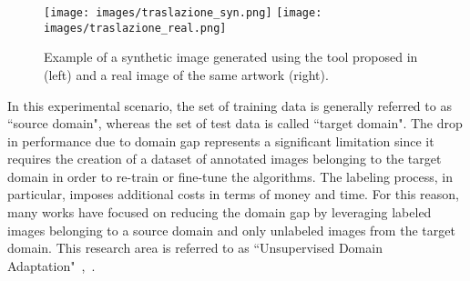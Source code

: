 \documentclass[preprint]{elsarticle}
\begin{document}
\begin{figure}[t]
            \centering
            \texttt{[image: images/traslazione\_syn.png]}
            \texttt{[image: images/traslazione\_real.png]}
            \caption{Example of a synthetic image generated using the tool proposed in~\cite{orlando2020egocentric} (left) and a real image of the same artwork (right).}
            \label{fig:noadapt1}
\end{figure}
In this experimental scenario, the set of training data is generally referred to as ``source domain", whereas the set of test data is called ``target domain". The drop in performance due to domain gap represents a significant limitation since it requires the creation of a dataset of annotated images belonging to the target domain in order to re-train or fine-tune the algorithms. The labeling process, in particular, imposes additional costs in terms of money and time. For this reason, many works have focused on reducing the domain gap by leveraging labeled images belonging to a source domain and only unlabeled images from the target domain. This research area is referred to as ``Unsupervised Domain Adaptation"~\cite{Tzeng_2017},~\cite{ganin2014unsupervised}.
\newline
\end{document}
